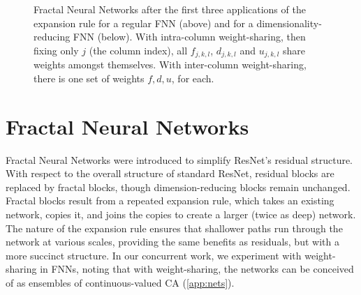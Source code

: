 \documentclass{article}
\begin{document}
\begin{figure*}
\caption{Fractal Neural Networks after the first three applications of the expansion rule for a regular FNN (above) and for a dimensionality-reducing FNN (below). With intra-column weight-sharing, then fixing only $j$ (the column index), all $f_{j,k,l}$, $d_{j,k,l}$ and $u_{j,k,l}$ share weights amongst themselves. With inter-column weight-sharing, there is one set of weights $f, d, u$, for each.}
\label{fig:frac}
\end{figure*}
\section{Fractal Neural Networks}


Fractal Neural Networks \cite{larsson2016fractalnet} were introduced to simplify ResNet's \cite{he2016deep} residual structure. 
With respect to the overall structure of standard ResNet, residual blocks are replaced by fractal blocks, though dimension-reducing blocks remain unchanged.
Fractal blocks result from a repeated expansion rule, which takes an existing network, copies it, and joins the copies to create a larger (twice as deep) network.
The nature of the expansion rule ensures that shallower paths run through the network at various scales, providing the same benefits as residuals, but with a more succinct structure.
In our concurrent work, we experiment with weight-sharing in FNNs, noting that with weight-sharing, the networks can be conceived of as ensembles of continuous-valued CA (\ref{app:nets}).
\end{document}
